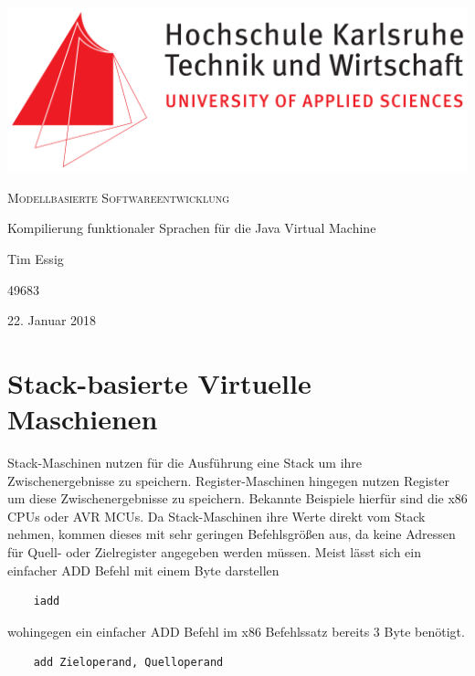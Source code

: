 \documentclass[a4paper, 11pt]{article}
\begin{document}
	
  \begin{titlepage}
  	\centering
  	\includegraphics[width=\linewidth]{Hska_logo}
  	
  	\vspace{3em}
  	{\scshape \Large Modellbasierte Softwareentwicklung}
  	
  	\vspace{1.5em}
  	{\huge Kompilierung funktionaler Sprachen für die Java Virtual Machine}
  	
  	\vspace{3em}
  	{\large Tim Essig}
  	
  	{\large 49683}

 	\vspace{3em}
 	22. Januar 2018
  \end{titlepage}

  
  \section{Stack-basierte Virtuelle Maschienen}
	
	Stack-Maschinen nutzen für die Ausführung eine Stack um ihre Zwischenergebnisse zu speichern. Register-Maschinen hingegen nutzen Register um diese Zwischenergebnisse zu speichern. Bekannte Beispiele hierfür sind die x86 CPUs oder AVR MCUs. 
	Da Stack-Maschinen ihre Werte direkt vom Stack nehmen, kommen dieses mit sehr geringen Befehlsgrößen aus, da keine Adressen für Quell- oder Zielregister angegeben werden müssen. Meist lässt sich ein einfacher ADD Befehl mit einem Byte darstellen
	
	\begin{lstlisting}
	iadd
	\end{lstlisting}
	
	wohingegen ein einfacher ADD Befehl im x86 Befehlssatz bereits 3 Byte benötigt. 
	
	\begin{lstlisting}
	add Zieloperand, Quelloperand
	\end{lstlisting}
	
\end{document}
